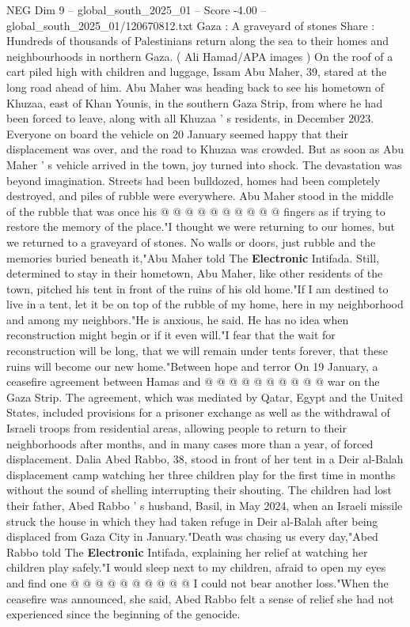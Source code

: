 \begin{textsample}{NEG Dim 9 – global\_south\_2025\_01 – Score -4.00 – global\_south\_2025\_01/120670812.txt}  \label{ex:f9_neg_112}
Gaza : A graveyard of stones Share : Hundreds of thousands of Palestinians return along the sea to their homes and neighbourhoods in northern Gaza. ( Ali Hamad/APA images ) On the roof of a cart piled high with children and luggage, Issam Abu Maher, 39, stared at the long road ahead of him.
Abu Maher was heading back to see his hometown of Khuzaa, east of Khan Younis, in the southern Gaza Strip, from where he had been forced to leave, along with all Khuzaa ' s residents, in December 2023.
Everyone on board the vehicle on 20 January seemed happy that their displacement was over, and the road to Khuzaa was crowded.
But as soon as Abu Maher ' s vehicle arrived in the town, joy turned into shock.
The devastation was beyond imagination.
Streets had been bulldozed, homes had been completely destroyed, and piles of rubble were everywhere.
Abu Maher stood in the middle of the rubble that was once his @ @ @ @ @ @ @ @ @ @ fingers as if trying to restore the memory of the place."I thought we were returning to our homes, but we returned to a graveyard of stones.
No walls or doors, just rubble and the memories buried beneath it,"Abu Maher told The \textbf{Electronic} Intifada.
Still, determined to stay in their hometown, Abu Maher, like other residents of the town, pitched his tent in front of the ruins of his old home."If I am destined to live in a tent, let it be on top of the rubble of my home, here in my neighborhood and among my neighbors."He is anxious, he said.
He has no idea when reconstruction might begin or if it even will."I fear that the wait for reconstruction will be long, that we will remain under tents forever, that these ruins will become our new home."Between hope and terror On 19 January, a ceasefire agreement between Hamas and @ @ @ @ @ @ @ @ @ @ war on the Gaza Strip.
The agreement, which was mediated by Qatar, Egypt and the United States, included provisions for a prisoner exchange as well as the withdrawal of Israeli troops from residential areas, allowing people to return to their neighborhoods after months, and in many cases more than a year, of forced displacement.
Dalia Abed Rabbo, 38, stood in front of her tent in a Deir al-Balah displacement camp watching her three children play for the first time in months without the sound of shelling interrupting their shouting.
The children had lost their father, Abed Rabbo ' s husband, Basil, in May 2024, when an Israeli missile struck the house in which they had taken refuge in Deir al-Balah after being displaced from Gaza City in January."Death was chasing us every day,"Abed Rabbo told The \textbf{Electronic} Intifada, explaining her relief at watching her children play safely."I would sleep next to my children, afraid to open my eyes and find one @ @ @ @ @ @ @ @ @ @ I could not bear another loss."When the ceasefire was announced, she said, Abed Rabbo felt a sense of relief she had not experienced since the beginning of the genocide.

\end{textsample}
